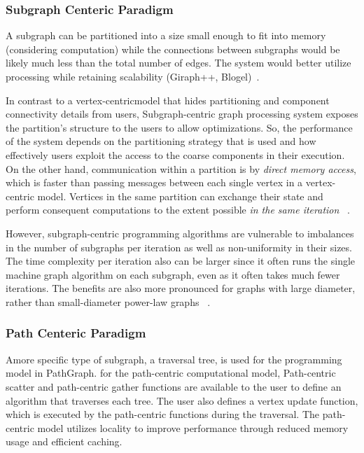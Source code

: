 \documentclass[UTF8,12pt,a4paper]{article}
\begin{document}
\subsubsection{Subgraph Centeric Paradigm}
A subgraph can be partitioned into a size small enough to fit into memory
(considering computation) while the connections between subgraphs would be likely
much less than the total number of edges.
The system would better utilize processing while retaining scalability
(Giraph++, Blogel)~\cite{DBLP:journals/csur/McCuneWM15}.

In contrast to a vertex-centricmodel that hides partitioning
and component connectivity details from users,
Subgraph-centric graph processing system
exposes the partition’s structure to the users to allow optimizations.
So, the performance of the system depends on the partitioning strategy that is used
and how effectively users exploit the access to the coarse components in their execution.
On the other hand, communication within a partition is by \textit{direct memory access},
which is faster than passing messages between each single vertex in a vertex-centric model.
Vertices in the same partition can exchange their state
and perform consequent computations to the extent possible \textit{in the same iteration}
~\cite{DBLP:journals/csur/HeidariSCB18}.

However, subgraph-centric programming algorithms are vulnerable
to imbalances in the number of subgraphs per iteration
as well as non-uniformity in their sizes.
The time complexity per iteration also can be larger
since it often runs the single machine graph algorithm on each subgraph,
even as it often takes much fewer iterations.
The benefits are also more pronounced for graphs with large diameter,
rather than small-diameter power-law graphs
~\cite{DBLP:journals/csur/HeidariSCB18}.
\subsubsection{Path Centeric Paradigm}
Amore specific type of subgraph, a traversal tree,
is used for the programming model in PathGraph.
for the path-centric computational model,
Path-centric scatter and path-centric gather functions
are available to the user to define an algorithm that traverses each tree.
The user also defines a vertex update function,
which is executed by the path-centric functions during the traversal.
The path-centric model utilizes locality to improve performance
through reduced memory usage and efficient caching.
\end{document}
